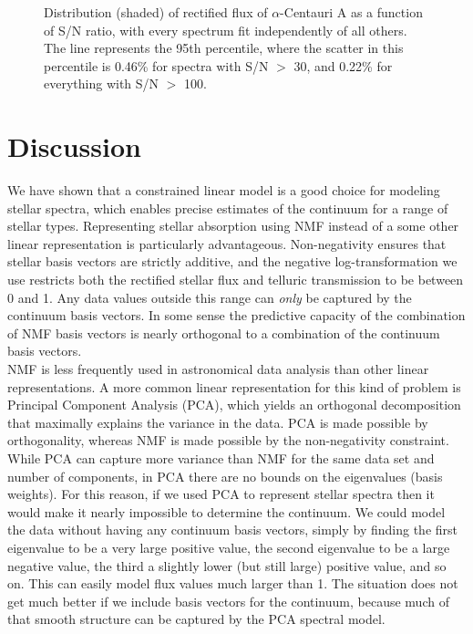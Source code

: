 \documentclass[modern]{aastex631}
\begin{document}


\begin{figure}
    \caption{Distribution (shaded) of rectified flux of $\alpha$-Centauri A as a function of S/N ratio, with every spectrum fit independently of all others. The line represents the 95th percentile, where the scatter in this percentile is 0.46\% for spectra with S/N $>$ 30, and 0.22\% for everything with S/N $>$ 100. \label{fig:alpha-cen-wrt-snr}}
\end{figure}

\section{Discussion}\label{sec:discussion}

We have shown that a constrained linear model is a good choice for modeling stellar spectra, which enables precise estimates of the continuum for a range of stellar types. Representing stellar absorption using NMF instead of a some other linear representation is particularly advantageous. Non-negativity ensures that stellar basis vectors are strictly additive, and the negative log-transformation we use restricts both the rectified stellar flux and telluric transmission to be between 0 and 1. Any data values outside this range can \emph{only} be captured by the continuum basis vectors. In some sense the predictive capacity of the combination of NMF basis vectors is nearly orthogonal to a combination of the continuum basis vectors.\\

NMF is less frequently used in astronomical data analysis than other linear representations. A more common linear representation for this kind of problem is Principal Component Analysis (PCA), which yields an orthogonal decomposition that maximally explains the variance in the data. PCA is made possible by orthogonality, whereas NMF is made possible by the non-negativity constraint. While PCA can capture more variance than NMF for the same data set and number of components, in PCA there are no bounds on the eigenvalues (basis weights). For this reason, if we used PCA to represent stellar spectra then it would make it nearly impossible to determine the continuum. We could model the data without having any continuum basis vectors, simply by finding the first eigenvalue to be a very large positive value, the second eigenvalue to be a large negative value, the third a slightly lower (but still large) positive value, and so on. This can easily model flux values much larger than 1. The situation does not get much better if we include basis vectors for the continuum, because much of that smooth structure can be captured by the PCA spectral model.\\
\end{document}
